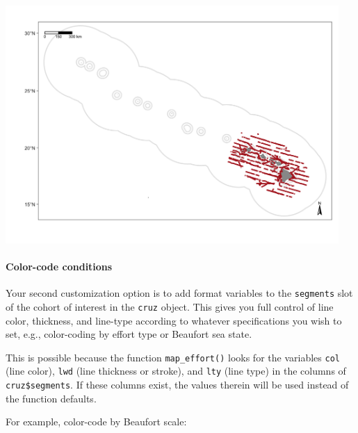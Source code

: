 \documentclass[
]{book}
\begin{document}
\includegraphics[width=0.95\textwidth,height=\textheight]{img/map_tracks2.png}

\hypertarget{color-code-conditions}{%
\paragraph{Color-code conditions}\label{color-code-conditions}}

Your second customization option is to add format variables to the \texttt{segments} slot of the cohort of interest in the \texttt{cruz} object. This gives you full control of line color, thickness, and line-type according to whatever specifications you wish to set, e.g., color-coding by effort type or Beaufort sea state.

This is possible because the function \texttt{map\_effort()} looks for the variables \texttt{col} (line color), \texttt{lwd} (line thickness or stroke), and \texttt{lty} (line type) in the columns of \texttt{cruz\$segments}. If these columns exist, the values therein will be used instead of the function defaults.

For example, color-code by Beaufort scale:
\end{document}

